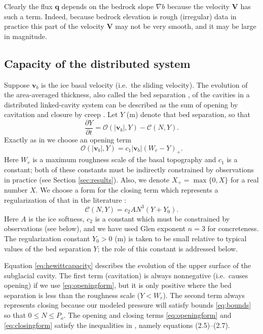 \documentclass[11pt,final]{amsart}%
\newcommand\bv{\mathbf{v}}
\newcommand\bV{\mathbf{V}}
\newcommand\bq{\mathbf{q}}
\newcommand{\grad}{\nabla}
\begin{document}
Clearly the flux $\bq$ depends on the bedrock slope $\grad b$ because the velocity $\bV$ has such a term.  Indeed, because bedrock elevation is rough (irregular) data in practice this part of the velocity $\bV$ may not be very smooth, and it may be large in magnitude.


\subsection*{Capacity of the distributed system}  Suppose $\bv_b$ is the ice basal velocity (i.e.~the sliding velocity).  The evolution of the area-averaged thickness, also called the bed separation \citep{Bartholomausetal2011}, of the cavities in a distributed linked-cavity system \citep{Schoofetal2012} can be described as the sum of opening by cavitation and closure by creep \citep{Hewitt2011}.  Let $Y$ (m) denote that bed separation, so that
\begin{equation}
\frac{\partial Y}{\partial t} = \mathcal{O}(|\bv_b|,Y) - \mathcal{C}(N,Y). \label{eq:hewittcapacity}
\end{equation}
Exactly as in \cite{Schoofetal2012} we choose an opening term
\begin{equation}
 \mathcal{O}(|\bv_b|,Y) = c_1 |\bv_b| (W_r - Y)_+. \label{eq:openingform}
\end{equation}
Here $W_r$ is a maximum roughness scale of the basal topography and $c_1$ is a constant; both of these constants must be indirectly constrained by observations in practice (see Section \ref{sec:results}).  Also, we denote $X_+= \max\{0,X\}$ for a real number $X$.  We choose a form for the closing term which represents a regularization of that in the literature \citep{Hewitt2011,Schoofmeltsupply,Schoofetal2012}:
\begin{equation}
\mathcal{C}(N,Y) = c_2 A N^3 (Y+Y_0). \label{eq:closingform}
\end{equation}
Here $A$ is the ice softness, $c_2$ is a constant which must be constrained by observations (see below), and we have used Glen exponent $n=3$ for concreteness.  The regularization constant $Y_0>0$ (m) is taken to be small relative to typical values of the bed separation $Y$; the role of this constant is addressed below.

Equation \eqref{eq:hewittcapacity} describes the evolution of the upper surface of the subglacial cavity.  The first term (cavitation) is always nonnegative (i.e.~causes opening) if we use \eqref{eq:openingform}, but it is only positive where the bed separation is less than the roughness scale ($Y<W_r$).  The second term always represents closing because our modeled pressure will satisfy bounds \eqref{eq:bounds} so that $0\le N \le P_o$.  The opening and closing terms \eqref{eq:openingform} and \eqref{eq:closingform} satisfy the inequalities in \cite{Schoofetal2012}, namely equations (2.5)--(2.7).
\end{document}

